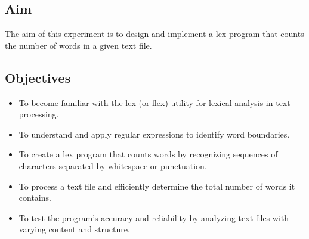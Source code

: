 \documentclass[12pt]{article}
\begin{document}
\subsection*{Aim}
The aim of this experiment is to design and implement a lex program that counts the number of words in a given text file.

\subsection*{Objectives}
\begin{itemize}
    \item To become familiar with the lex (or flex) utility for lexical analysis in text processing.
    \item To understand and apply regular expressions to identify word boundaries.
    \item To create a lex program that counts words by recognizing sequences of characters separated by whitespace or punctuation.
    \item To process a text file and efficiently determine the total number of words it contains.
    \item To test the program's accuracy and reliability by analyzing text files with varying content and structure.
\end{itemize}
\end{document}
